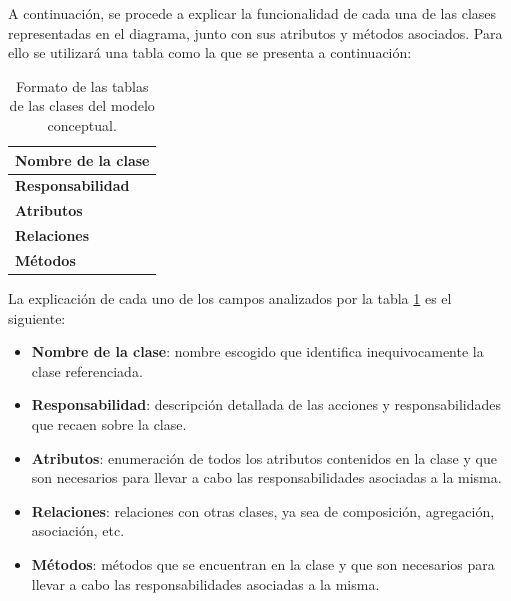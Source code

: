 \par A continuación, se procede a explicar la funcionalidad de cada una de las clases representadas en el diagrama, junto con sus atributos y métodos asociados. Para ello se utilizará una tabla como la que se presenta a continuación:

\begin{table}[H]
\begin{center}
\begin{tabular}{p{} p{11cm}}
\multicolumn{2}{c}{\textbf{Nombre de la clase} } \\ \hline \hline
\textbf{Responsabilidad} &  \\ \hline
\textbf{Atributos} &  \\ \hline
\textbf{Relaciones} & \\ \hline
\textbf{Métodos} &  \\ \hline
\end{tabular}
\caption{Formato de las tablas de las clases del modelo conceptual.}
\label{tab:formatoD_clases}
\end{center}
\end{table}

\par La explicación de cada uno de los campos analizados por la tabla \ref{tab:formatoD_clases} es el siguiente:
\begin{itemize}
  \item \textbf{Nombre de la clase}: nombre escogido que identifica inequivocamente la clase referenciada.
  \item \textbf{Responsabilidad}: descripción detallada de las acciones y responsabilidades que recaen sobre la clase.
  \item \textbf{Atributos}: enumeración de todos los atributos contenidos en la clase y que son necesarios para llevar a cabo las responsabilidades asociadas a la misma.
  \item \textbf{Relaciones}: relaciones con otras clases, ya sea de composición, agregación, asociación, etc.
  \item \textbf{Métodos}: métodos que se encuentran en la clase y que son necesarios para llevar a cabo las responsabilidades asociadas a la misma.
\end{itemize}









